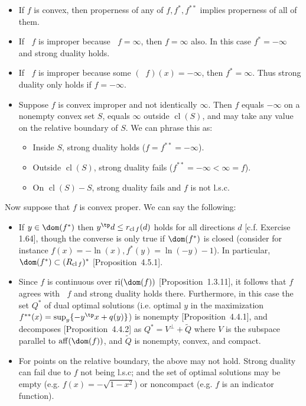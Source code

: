 \documentclass{article}
\DeclareMathOperator{\cl}{cl}
\DeclareMathOperator{\aff}{aff}
\DeclareMathOperator{\relint}{ri}
\DeclareMathOperator{\cvxcl}{\breve{cl}}
\begin{document}
\begin{itemize}
\item If $f$ is convex, then properness of any of $f, f^*, f^{**}$ implies properness of all of them.
\item If $\cvxcl f$ is improper because $\cvxcl f = \infty$, then $f = \infty$ also.  In this case $f^* = -\infty$ and strong duality holds.
\item If $\cvxcl f$ is improper because some $(\cvxcl f)(x) = -\infty$, then $f^* = \infty$.  Thus strong duality only holds if $f = -\infty$.
\item Suppose $f$ is convex improper and not identically $\infty$.  Then $f$ equals $-\infty$ on a nonempty convex set $S$, equals $\infty$ outside $\cl(S)$, and may take any value on the relative boundary of $S$.  We can phrase this as:
  \begin{itemize}
  \item Inside $S$, strong duality holds ($f = f^{**} = -\infty$).
  \item Outside $\cl(S)$, strong duality fails ($f^{**} = -\infty < \infty = f$).
  \item On $\cl(S) - S$, strong duality fails and $f$ is not l.s.c.
  \end{itemize}
\end{itemize}

Now suppose that $f$ is convex proper.  We can say the following:
\begin{itemize}
\item If $y \in \dom(f^*)$ then $y^\tp d \le r_{\cl f}(d)$ holds for all directions $d$
  [c.f. Exercise 1.64], though the converse is only true if $\dom(f^*)$ is closed (consider for instance $f(x) = -\ln(x), f^*(y) = \ln(-y) - 1$).
  In particular, $\dom(f^*) \subset (R_{\cl f})^*$ [Proposition~4.5.1].
\item Since $f$ is continuous over $\relint(\dom(f))$ [Proposition~1.3.11], it follows that $f$ agrees with $\cvxcl f$ and strong duality holds there.
  Furthermore, in this case the set $Q^*$ of dual optimal solutions (i.e. optimal $y$ in the maximization $f^{**}(x) = \sup_y\{-y^\tp x + q(y)\}$) is nonempty [Proposition~4.4.1],
  and decomposes [Proposition~4.4.2] as $Q^* = V^\bot + \tilde Q$
  where $V$ is the subspace parallel to $\aff(\dom(f))$,
  and $\tilde Q$ is nonempty, convex, and compact.
\item For points on the relative boundary, the above may not hold.  Strong duality can fail due to $f$ not being l.s.c; and the set of optimal solutions may be empty (e.g. $f(x) = -\sqrt{1 - x^2}$) or noncompact (e.g. $f$ is an indicator function).
\end{itemize}
\end{document}
